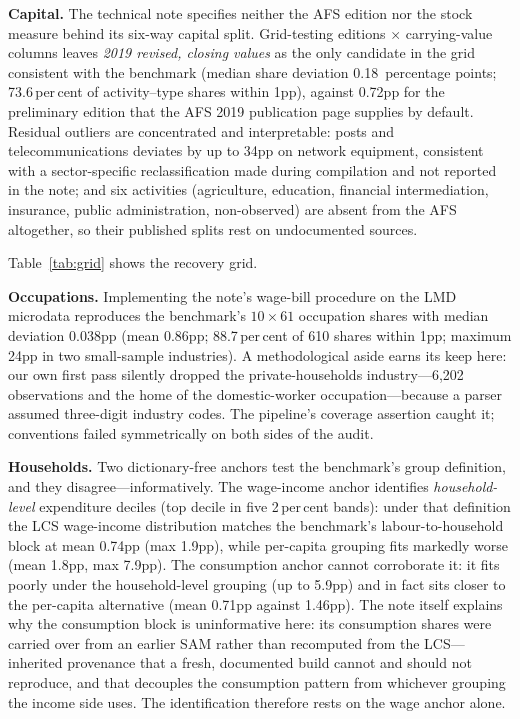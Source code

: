 \textbf{Capital.} The technical note specifies neither the AFS edition nor
the stock measure behind its six-way capital split. Grid-testing editions
$\times$ carrying-value columns leaves \emph{2019 revised, closing
values} as the only candidate in the grid consistent with the benchmark
(median share deviation 0.18~percentage
points; 73.6\,per\,cent of activity--type shares within 1pp), against
0.72pp for the preliminary edition that the AFS 2019 publication page
supplies by default. Residual outliers are concentrated and interpretable:
posts and telecommunications deviates by up to 34pp on network equipment,
consistent with a sector-specific reclassification made during compilation
and not reported in the note; and six
activities (agriculture, education, financial intermediation, insurance,
public administration, non-observed) are absent from the AFS altogether, so
their published splits rest on undocumented sources.

Table~\ref{tab:grid} shows the recovery grid.

\begin{table}[t]
\centering\small
\caption{Grid recovery of the capital split's undocumented basis: agreement
with the benchmark's activity--type shares by AFS edition and stock
measure.}
\label{tab:grid}

\end{table}

\textbf{Occupations.} Implementing the note's wage-bill procedure on the
LMD microdata reproduces the benchmark's $10\times61$ occupation shares
with median deviation 0.038pp (mean 0.86pp; 88.7\,per\,cent of 610 shares
within 1pp; maximum 24pp in two small-sample industries). A methodological
aside earns its keep here: our own first pass silently dropped the
private-households industry---6{,}202 observations and the home of the
domestic-worker occupation---because a parser assumed three-digit industry
codes. The pipeline's coverage assertion caught it; conventions failed
symmetrically on both sides of the audit.

\textbf{Households.} Two dictionary-free anchors test the benchmark's
group definition, and they disagree---informatively. The wage-income
anchor identifies \emph{household-level} expenditure deciles (top decile
in five 2\,per\,cent bands): under that definition the LCS wage-income
distribution matches the benchmark's labour-to-household block at mean
0.74pp (max 1.9pp), while per-capita grouping fits markedly worse (mean
1.8pp, max 7.9pp). The consumption anchor cannot corroborate it: it fits
poorly under the household-level grouping (up to 5.9pp) and in fact sits
closer to the per-capita alternative (mean 0.71pp against 1.46pp). The
note itself explains why the consumption block is uninformative here: its
consumption shares were carried over from an earlier SAM rather than
recomputed from the LCS---inherited provenance that a fresh, documented
build cannot and should not reproduce, and that decouples the consumption
pattern from whichever grouping the income side uses. The identification
therefore rests on the wage anchor alone.

